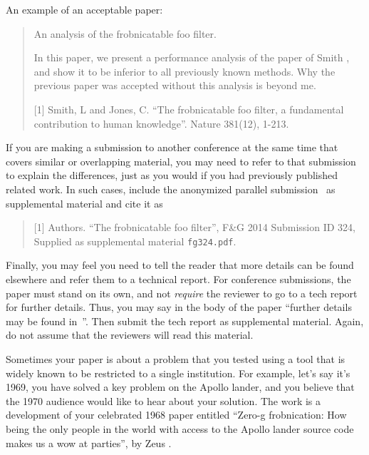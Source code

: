 An example of an acceptable paper:
\begin{quote}
\begin{center}
     An analysis of the frobnicatable foo filter.
\end{center}

   In this paper, we present a performance analysis of the paper of Smith \etal [1], and show it to be inferior to all previously known methods.
   Why the previous paper was accepted without this analysis is beyond me.

   [1] Smith, L and Jones, C. ``The frobnicatable foo filter, a fundamental contribution to human knowledge''. Nature 381(12), 1-213.
\end{quote}

If you are making a submission to another conference at the same time that covers similar or overlapping material, you may need to refer to that submission to explain the differences, just as you would if you had previously published related work.
In such cases, include the anonymized parallel submission~\cite{Authors14} as supplemental material and cite it as
\begin{quote}
[1] Authors. ``The frobnicatable foo filter'', F\&G 2014 Submission ID 324, Supplied as supplemental material {\tt fg324.pdf}.
\end{quote}

Finally, you may feel you need to tell the reader that more details can be found elsewhere and refer them to a technical report.
For conference submissions, the paper must stand on its own, and not {\em require} the reviewer to go to a tech report for further details.
Thus, you may say in the body of the paper ``further details may be found in~\cite{Authors14b}''.
Then submit the tech report as supplemental material.
Again, do not assume that the reviewers will read this material.

Sometimes your paper is about a problem that you tested using a tool that is widely known to be restricted to a single institution.
For example, let's say it's 1969, you have solved a key problem on the Apollo lander, and you believe that the 1970 audience would like to hear about your
solution.
The work is a development of your celebrated 1968 paper entitled ``Zero-g frobnication: How being the only people in the world with access to the Apollo lander source code makes us a wow at parties'', by Zeus \etal.

